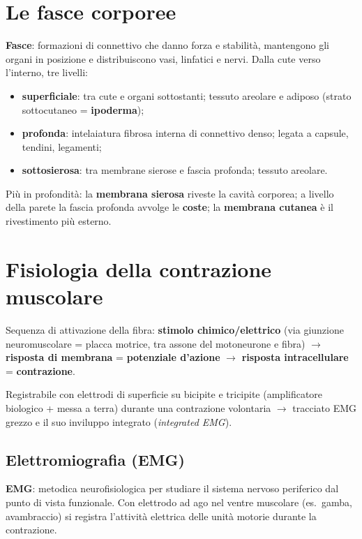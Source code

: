 \section{Le fasce corporee}

\textbf{Fasce}: formazioni di connettivo che danno forza e stabilità, mantengono gli organi in
posizione e distribuiscono vasi, linfatici e nervi. Dalla cute verso l'interno, tre livelli:
\begin{itemize}
  \item \textbf{superficiale}: tra cute e organi sottostanti; tessuto areolare e adiposo (strato
    sottocutaneo = \textbf{ipoderma});
  \item \textbf{profonda}: intelaiatura fibrosa interna di connettivo denso; legata a capsule,
    tendini, legamenti;
  \item \textbf{sottosierosa}: tra membrane sierose e fascia profonda; tessuto areolare.
\end{itemize}
Più in profondità: la \textbf{membrana sierosa} riveste la cavità corporea; a livello della parete
la fascia profonda avvolge le \textbf{coste}; la \textbf{membrana cutanea} è il rivestimento più
esterno.

\section{Fisiologia della contrazione muscolare}

Sequenza di attivazione della fibra: \textbf{stimolo chimico/elettrico} (via giunzione
neuromuscolare = placca motrice, tra assone del motoneurone e fibra) $\rightarrow$ \textbf{risposta
di membrana} = \textbf{potenziale d'azione} $\rightarrow$ \textbf{risposta intracellulare} =
\textbf{contrazione}.

Registrabile con elettrodi di superficie su bicipite e tricipite (amplificatore biologico + messa a
terra) durante una contrazione volontaria $\rightarrow$ tracciato EMG grezzo e il suo inviluppo
integrato (\textit{integrated EMG}).

\subsection{Elettromiografia (EMG)}
\textbf{EMG}: metodica neurofisiologica per studiare il sistema nervoso periferico dal punto di
vista funzionale. Con elettrodo ad ago nel ventre muscolare (es.\ gamba, avambraccio) si registra
l'attività elettrica delle unità motorie durante la contrazione.

